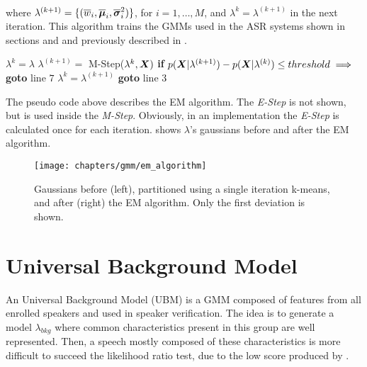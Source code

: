 \noindent\\ where $\lambda^{(k+1)} = \{(\overline{w}_i, \overline{\boldsymbol{\mu}}_i, \overline{\boldsymbol{\sigma}}_i^2)\}$, for $i = 1, \dots, M$, and $\lambda^{k} = \lambda^{(k+1)}$ in the next iteration. This algorithm trains the GMMs used in the ASR systems shown in sections  and  and previously described in .

\begin{algorithm}
\label{em-algorithm}
\begin{algorithmic}[1]
\State $\lambda^k = \lambda$
\State $\lambda^{(k+1)} =$ M-Step($\lambda^k, \boldsymbol{X})$
\State \textbf{if} $p(\boldsymbol{X}|\lambda^{(k+1)}) - p(\boldsymbol{X}|\lambda^{(k)}) \leq threshold \implies$ \textbf{goto} line $7$
\State$\lambda^k = \lambda^{(k+1)}$
\State \textbf{goto} line $3$
\EndProcedure
\end{algorithmic}
\end{algorithm}

\noindent The pseudo code above describes the EM algorithm. The \emph{E-Step} is not shown, but is used inside the \emph{M-Step}. Obviously, in an implementation the \emph{E-Step} is calculated once for each iteration.  shows $\lambda$'s gaussians before and after the EM algorithm.

\begin{figure}[ht]
    \centering
    \texttt{[image: chapters/gmm/em\_algorithm]}
    \caption{Gaussians before (left), partitioned using a single iteration k-means, and after (right) the EM algorithm. Only the first deviation is shown.}
    \label{fig:em_algorithm}
\end{figure}

\section{Universal Background Model}
\label{sec:ubm}

An Universal Background Model (UBM) is a GMM composed of features from all enrolled speakers and used in speaker verification. The idea is to generate a model $\lambda_{bkg}$ where common characteristics present in this group are well represented. Then, a speech mostly composed of these characteristics is more difficult to succeed the likelihood ratio test, due to the low score produced by .

